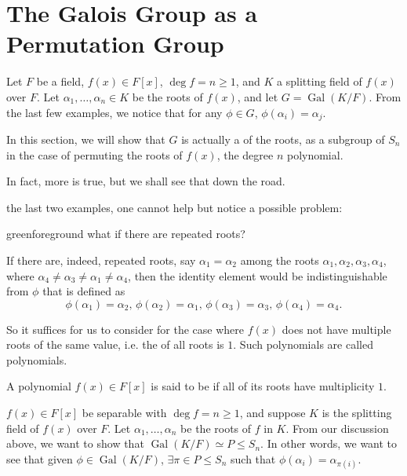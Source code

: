 \documentclass[notoc,notitlepage]{tufte-book}
\DeclareMathOperator{\Gal}{Gal}
\begin{document}

\section{The Galois Group as a Permutation Group}%
\label{sec:the_galois_group_as_a_permutation_group}

Let $F$ be a field, $f(x) \in F[x]$, $\deg f = n \geq 1$, and $K$ a splitting
field of $f(x)$ over $F$. Let $\alpha_1, \ldots, \alpha_n \in K$ be the roots of
$f(x)$, and let $G = \Gal(K / F)$. From the last few examples, we notice that
for any $\phi \in G$, $\phi(\alpha_i) = \alpha_j$.

In this section, we will show that $G$ is actually a 
of the roots, as a subgroup of $S_n$ in the case of permuting the roots of
$f(x)$, the degree $n$ polynomial.

In fact, more is true, but we shall see that down the road.

 the last two examples, one cannot help but notice a possible
problem:
\begin{quotebox}{green}{foreground}
  what if there are repeated roots?
\end{quotebox}
If there are, indeed, repeated roots, say $\alpha_1 = \alpha_2$ among the roots
$\alpha_1, \alpha_2, \alpha_3, \alpha_4$, where $\alpha_4 \neq \alpha_3 \neq
\alpha_1 \neq \alpha_4$, then the identity element would be indistinguishable
from $\phi$ that is defined as
\begin{equation*}
  \phi(\alpha_1) = \alpha_2, \, \phi(\alpha_2) = \alpha_1, \, \phi(\alpha_3) =
  \alpha_3, \, \phi(\alpha_4) = \alpha_4.
\end{equation*}

So it suffices for us to consider for the case where $f(x)$ does not have
multiple roots of the same value, i.e. the  of all roots
is $1$.  Such polynomials are called  polynomials.

\begin{defn}\label{defn:separable_polynomials}
  A polynomial $f(x) \in F[x]$ is said to be  if all of its
  roots have multiplicity $1$.
\end{defn}

 $f(x) \in F[x]$ be separable with $\deg f = n \geq 1$, and
suppose $K$ is the splitting field of $f(x)$ over $F$. Let $\alpha_1, \ldots,
\alpha_n$ be the roots of $f$ in $K$. From our discussion above, we want to show
that $\Gal(K / F) \simeq P \leq S_n$. In other words, we want to see that given
$\phi \in \Gal(K / F)$, $\exists \pi \in P \leq S_n$ such that $\phi(\alpha_i) =
\alpha_{\pi(i)}$.
\end{document}
